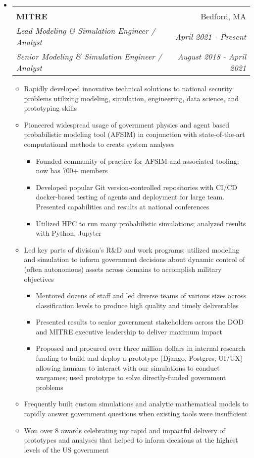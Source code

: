 \documentclass[letterpaper,11pt]{article}
\makeatletter
\newcommand{\ressubheadingmitre}[6]{\vspace{-29pt}
\begin{tabular*}{7.0in}{l@{\extracolsep{\fill}}r}
				\vspace{15pt} %
                \\
                \textbf{#1} & #2 \\
                \textit{#3} & \textit{#4} \\
                \textit{#5} & \textit{#6}
\end{tabular*}\vspace{-6pt}}
\makeatother
\begin{document}
\begin{itemize}
\item \ressubheadingmitre{MITRE}{Bedford, MA}{Lead Modeling \& Simulation Engineer / Analyst}{April 2021 - Present}{Senior Modeling \& Simulation Engineer / Analyst}{August 2018 - April 2021}

\begin{itemize}
\item Rapidly developed innovative technical solutions to national security problems utilizing modeling, simulation, engineering, data science, and prototyping skills



\item Pioneered widespread usage of government physics and agent based probabilistic modeling tool (AFSIM) in conjunction with state-of-the-art computational methods to create system analyses
\begin{itemize}
\item Founded community of practice for AFSIM and associated tooling; now has 700+ members
\item Developed popular Git version-controlled repositories with CI/CD docker-based testing of agents and deployment for large team. Presented capabilities and results at national conferences
\item Utilized HPC to run many probabilistic simulations; analyzed results with Python, Jupyter

\end{itemize}

\item Led key parts of division's R\&D and work programs; utilized modeling and simulation to inform government decisions about dynamic control of (often autonomous) assets across domains to accomplish military objectives
\begin{itemize}
\item Mentored dozens of staff and led diverse teams of various sizes across classification levels to produce high quality and timely deliverables
\item Presented results to senior government stakeholders across the DOD and MITRE executive leadership to deliver maximum impact
\item{Proposed and procured over three million dollars in internal research funding to build and deploy a prototype (Django, Postgres, UI/UX) allowing humans to interact with our simulations to conduct wargames; used prototype to solve directly-funded government problems}
\end{itemize}

\item{Frequently built custom simulations and analytic mathematical models to rapidly answer government questions when existing tools were insufficient}
\item{Won over 8 awards celebrating my rapid and impactful delivery of prototypes and analyses that helped to inform decisions at the highest levels of the US government}
\end{itemize}
\end{itemize}
\end{document}
